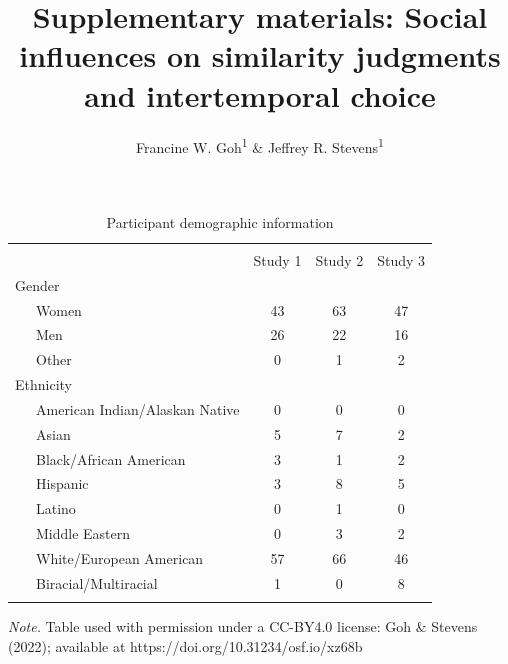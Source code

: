 \documentclass[
  doc,floatsintext]{apa6}
\title{Supplementary materials: Social influences on similarity judgments and intertemporal choice}
\author{Francine W. Goh\textsuperscript{1} \& Jeffrey R. Stevens\textsuperscript{1}}
\date{}
\affiliation{\vspace{0.5cm}\textsuperscript{1} University of Nebraska-Lincoln}
\begin{document}
\maketitle

\renewcommand{\thetable}{S\arabic{table}}
\setcounter{table}{0}
\renewcommand{\thefigure}{S\arabic{figure}}
\setcounter{figure}{0}
\setcounter{page}{1}

\newpage

\begin{table}[tbp]

\begin{center}
\begin{threeparttable}

\caption{\label{tab:unnamed-chunk-1}Participant demographic information}

\small{

\begin{tabular}{lccc}
\toprule
 & \multicolumn{2}{c}{} \\
\cmidrule(r){2-4}
 & Study 1 & Study 2 & Study 3\\
\midrule
Gender &  &  & \\
\ \ \ Women & 43 & 63 & 47\\
\ \ \ Men & 26 & 22 & 16\\
\ \ \ Other & 0 & 1 & 2\\
Ethnicity &  &  & \\
\ \ \ American Indian/Alaskan Native & 0 & 0 & 0\\
\ \ \ Asian & 5 & 7 & 2\\
\ \ \ Black/African American & 3 & 1 & 2\\
\ \ \ Hispanic & 3 & 8 & 5\\
\ \ \ Latino & 0 & 1 & 0\\
\ \ \ Middle Eastern & 0 & 3 & 2\\
\ \ \ White/European American & 57 & 66 & 46\\
\ \ \ Biracial/Multiracial & 1 & 0 & 8\\
\bottomrule
\addlinespace
\end{tabular}

}

\begin{tablenotes}[para]
\normalsize{\textit{Note.} Table used with permission under a CC-BY4.0 license: Goh \& Stevens (2022); available at https://doi.org/10.31234/osf.io/xz68b}
\end{tablenotes}

\end{threeparttable}
\end{center}

\end{table}
\end{document}
